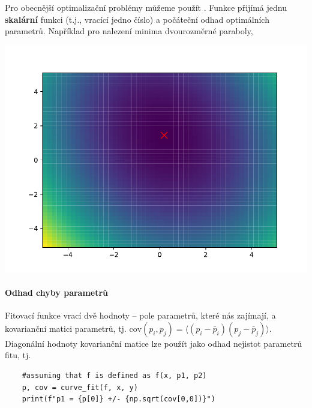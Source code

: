 Pro obecnější optimalizační problémy můžeme použít . Funkce  přijímá jednu \textbf{skalární} funkci (t.j., vracící jedno číslo) a počáteční odhad optimálních parametrů. Například pro nalezení minima dvourozměrné paraboly,

\begin{center}
    \includegraphics[width=0.5\linewidth]{parabola-minimize.pdf}
\end{center}

\paragraph{Odhad chyby parametrů} Fitovací funkce  vrací dvě hodnoty -- pole parametrů, které nás zajímají, a kovarianční matici parametrů, tj. $\mathrm{cov}(p_i, p_j) = \langle(p_i - \bar p_i)(p_j - \bar p_j)\rangle$. Diagonální hodnoty kovarianční matice lze použít jako odhad nejistot parametrů fitu, tj.
\begin{lstlisting}
    #assuming that f is defined as f(x, p1, p2)
    p, cov = curve_fit(f, x, y)
    print(f"p1 = {p[0]} +/- {np.sqrt(cov[0,0])}")
\end{lstlisting}


